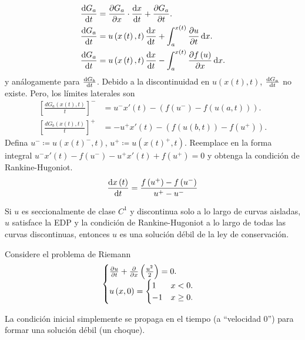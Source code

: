 \begin{align*}
	\diff{G_{a}}{t} & =
	\diffp{G_{a}}{x}\cdot
	\diff{x}{t}+
	\diffp{G_{a}}{t}.   \\
	\diff{G_{a}}{t} & =
	u\left(x\left(t\right),t\right)
	\diff{x}{t}+
	\int_{a}^{x\left(t\right)}
	\diffp{u}{t}
	\dl x.              \\
	\diff{G_{a}}{t} & =
	u\left(x\left(t\right),t\right)\diff{x}{t}-
	\int_{a}^{x\left(t\right)}
	\diffp{f\left(u\right)}{x}
	\dl x.
\end{align*}
y análogamente para $\diff{G_{b}}{t}$.
Debido a la discontinuidad en $u\left(x\left(t\right),t\right)$,
$\diff{G_{a}}{t}$ no existe.
Pero, los límites laterales son
\begin{align*}
	\left[
		\frac{dG_a(x(t), t)}{t}
	\right]^- & =
	u^-
	x'(t)-
	(f(u^-)-
	f(u(a, t))).  \\
	\left[
		\frac{dG_b(x(t), t)}{t}
	\right]^+ & =
	-u^+
	x'(t)-
	(f(u(b, t))-
	f(u^+)).
\end{align*}
Defina $u^{-}\coloneqq u\left(x\left(t\right)^-, t\right)$,
$u^{+}\coloneqq u\left(x\left(t\right)^{+},t\right)$.
Reemplace en la forma integral $u^-x'\left(t\right)-f(u^-)-u^+x'(t)+f\left(u^{+}\right)=0$
y obtenga la condición de Rankine-Hugoniot.
\begin{equation}
	\diff{x\left(t\right)}{t}=
	\frac{f\left(u^{+}\right)-f\left(u^{-}\right)}{u^{+}-u^{-}}
\end{equation}

\begin{theorem}
	Si $u$ es seccionalmente de clase $C^{1}$ y discontinua solo a lo largo
	de curvas aisladas, $u$ satisface la EDP y la condición de Rankine-Hugoniot
	a lo largo de todas las curvas discontinuas, entonces $u$ es una solución débil
	de la ley de conservación.
\end{theorem}

\begin{example}
	Considere el problema de Riemann
	\begin{equation*}
		\begin{cases}
			\diffp{u}{t}+
			\diffp{}{x}
			\left(\frac{u^{2}}{2}\right)=
			0. \\
			u\left(x,0\right)=
			\begin{cases}
				1  & x < 0.    \\
				-1 & x \geq 0.
			\end{cases}
		\end{cases}
	\end{equation*}
\end{example}
La condición inicial simplemente se propaga en el tiempo
(a ``velocidad $0$'') para formar una solución débil (un choque).

